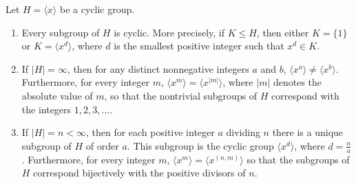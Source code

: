 \begin{theorem}[ ]
    Let \(H = \langle x  \rangle\) be a cyclic group.  
    \begin{enumerate}
        \item[(1)] Every subgroup of \( H  \) is cyclic. More precisely, if \( K \leq H  \), then either \( K = \{ 1  \}  \) or \( K = \langle x^{d} \rangle \), where \( d  \) is the smallest positive integer such that \( x^{d} \in K  \).
        \item[(2)] If \( | H  |  = \infty   \), then for any distinct nonnegative integers \( a \) and \( b  \), \( \langle x^{a} \rangle \neq \langle x^{b} \rangle  \). Furthermore, for every integer \( m  \), \( \langle x^{m} \rangle =  \langle x^{| m | } \rangle \), where \( | m |  \) denotes the absolute value of \( m  \), so that the nontrivial subgroups of \( H  \) correspond with the integers \( 1,2,3,\dots \). 
        \item[(3)] If \( | H  |  = n < \infty   \), then for each positive integer \( a  \) dividing \( n  \) there is a  unique subgroup of \( H  \) of order \( a  \). This subgroup is the cyclic group \( \langle x^{d} \rangle \), where \( d = \frac{ n }{ a }  \). Furthermore, for every integer \( m  \), \( \langle x^{m} \rangle= \langle x^{(n,m)} \rangle  \) so that the subgroups of \( H  \) correspond bijectively with the positive divisors of \( n  \).
    \end{enumerate}
\end{theorem}

